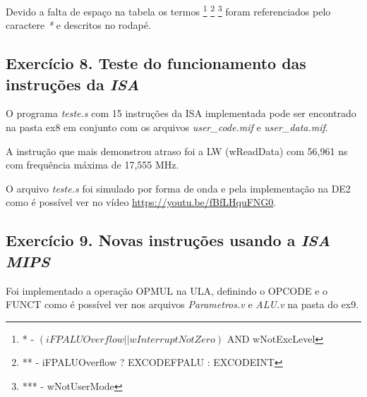 \documentclass[12pt]{article}
\begin{document}
Devido a falta de espaço na tabela os termos \footnote{* - $(iFPALUOverflow || wInterruptNotZero)$ AND wNotExcLevel}
\footnote{** - iFPALUOverflow ? EXCODEFPALU : EXCODEINT}
\footnote{*** - wNotUserMode} foram referenciados pelo caractere \textit{*} e descritos no rodapé.

\subsection{Exercício 8. Teste do funcionamento das instruções da \textit{ISA}}
\label{subsec:testeisa}

O programa \textit{teste.s} com 15 instruções da ISA implementada pode ser encontrado na pasta ex8 em conjunto com os arquivos \textit{user\_code.mif} e \textit{user\_data.mif}. 

A instrução que mais demonstrou atraso foi a LW (wReadData) com 56,961 ns com frequência máxima de 17,555 MHz.

O arquivo \textit{teste.s} foi simulado por forma de onda e pela implementação na DE2 como é possível ver no vídeo \url{https://youtu.be/fBfLHquFNG0}.
  
\subsection{Exercício 9. Novas instruções usando a \textit{ISA MIPS}}
\label{subsec:newint}

Foi implementado a operação OPMUL na ULA, definindo o OPCODE e o FUNCT como é possível ver nos arquivos \textit{Parametros.v} e \textit{ALU.v} na pasta do ex9.



\end{document}
